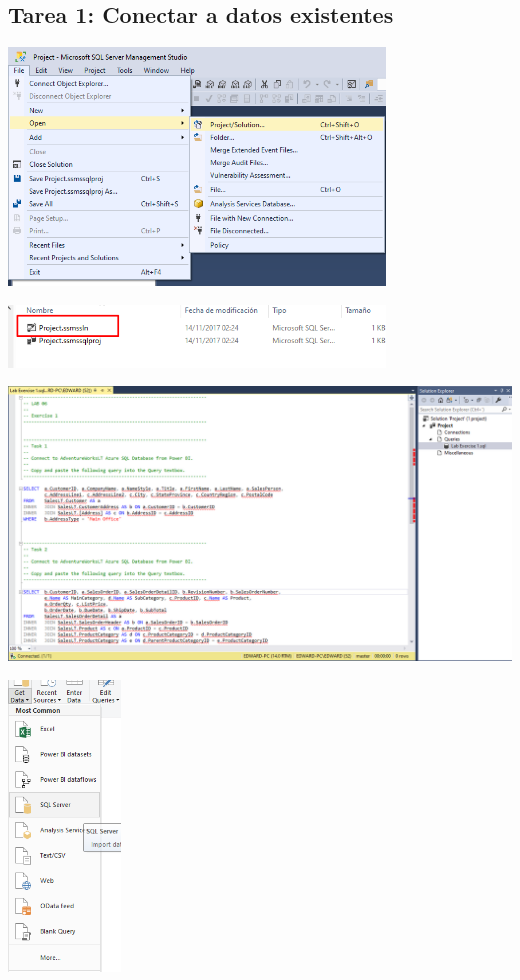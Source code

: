 \documentclass[12pt,letterpaper]{article}
\begin{document}
\subsection{Tarea 1: Conectar a datos existentes}
\begin{center}
\includegraphics[width=10cm]{images/1}\newline
\end{center}
\begin{center}
\includegraphics[width=10cm]{images/2}\newline
\end{center}
\begin{center}
\includegraphics[width=15cm]{images/3}\newline
\end{center}
\begin{center}
\includegraphics[width=3cm]{images/4}\newline
\end{center}
\end{document}
